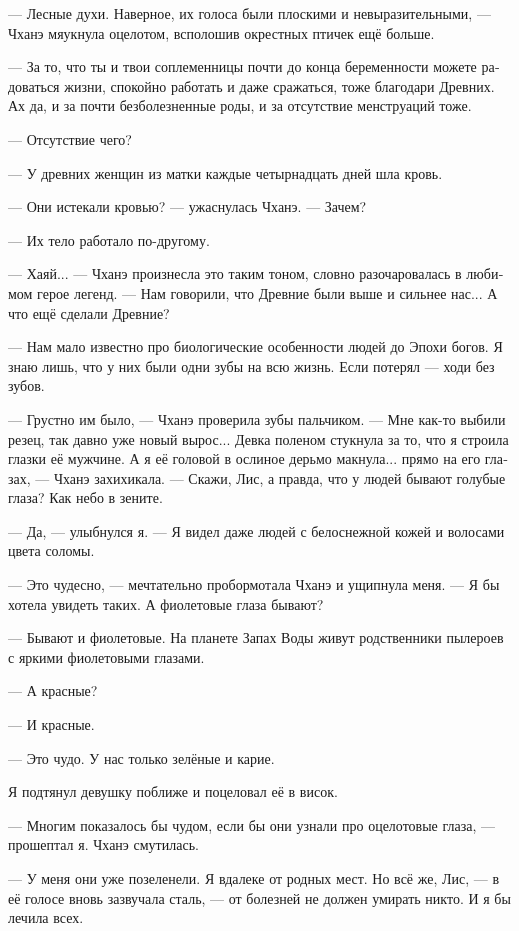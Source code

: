 \documentclass[a4paper,12pt,fleqn]{book}\usepackage{polyglossia}\setdefaultlanguage[babelshorthands=true]{russian}\setotherlanguage{english}\defaultfontfeatures{Ligatures=TeX,Mapping=tex-text}\usepackage{xcolor}\newcommand{\ml}[3]{#2}
\begin{document}
{--- Лесные духи.
Наверное, их голоса были плоскими и невыразительными, --- Чханэ мяукнула оцелотом, всполошив окрестных птичек ещё больше.

--- За то, что ты и твои соплеменницы почти до конца беременности можете радоваться жизни, спокойно работать и даже сражаться, тоже благодари Древних.
Ах да, и за почти безболезненные роды, и за отсутствие менструаций тоже.

--- Отсутствие чего?

--- У древних женщин из матки каждые четырнадцать дней шла кровь.

--- Они истекали кровью? --- ужаснулась Чханэ.
--- Зачем?

--- Их тело работало по-другому.

--- Хаяй... --- Чханэ произнесла это таким тоном, словно разочаровалась в любимом герое легенд.
--- Нам говорили, что Древние были выше и сильнее нас...
А что ещё сделали Древние?

--- Нам мало известно про биологические особенности людей до Эпохи богов.
Я знаю лишь, что у них были одни зубы на всю жизнь.
Если потерял --- ходи без зубов.

--- Грустно им было, --- Чханэ проверила зубы пальчиком.
--- Мне как-то выбили резец, так давно уже новый вырос...
Девка поленом стукнула за то, что я строила глазки её мужчине.
А я её головой в ослиное дерьмо макнула... прямо на его глазах, --- Чханэ захихикала.
--- Скажи, Лис, а правда, что у людей бывают голубые глаза?
Как небо в зените.

--- Да, --- улыбнулся я.
--- Я видел даже людей с белоснежной кожей и волосами цвета соломы.

--- Это чудесно, --- мечтательно пробормотала Чханэ и ущипнула меня.
--- Я бы хотела увидеть таких.
А фиолетовые глаза бывают?

--- Бывают и фиолетовые.
На планете Запах Воды живут родственники пылероев с яркими фиолетовыми глазами.

--- А красные?

--- И красные.

--- Это чудо.
У нас только зелёные и карие.

Я подтянул девушку поближе и поцеловал её в висок.

--- Многим показалось бы чудом, если бы они узнали про оцелотовые глаза, --- прошептал я.
Чханэ смутилась.

--- У меня они уже позеленели.
Я вдалеке от родных мест.
Но всё же, Лис, --- в её голосе вновь зазвучала сталь, --- от болезней не должен умирать никто.
И я бы лечила всех.

}
\end{document}
